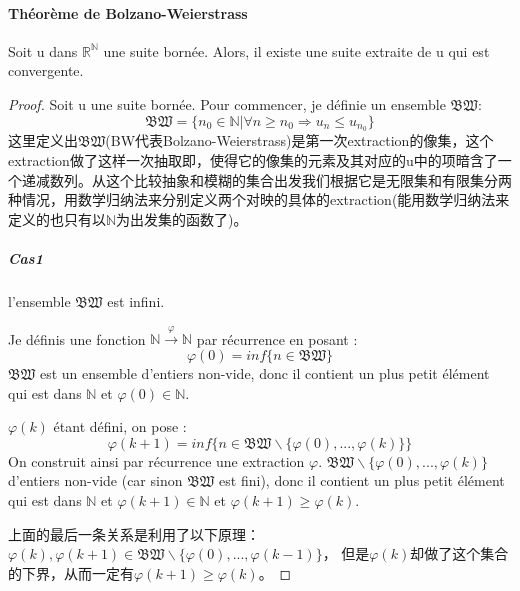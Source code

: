 \documentclass[12pt]{book}
\theoremstyle{definition}\newtheorem{dfn}{Définition}[chapter]
\theoremstyle{plain}\newtheorem{thm}{Théorème}[chapter]
\theoremstyle{plain}\newtheorem{prp}{Proposition}[chapter]
\theoremstyle{plain}\newtheorem{lem}{\bf Lemme}[chapter]
\theoremstyle{plain}\newtheorem{axm}{\bf Axiome}[chapter]
\theoremstyle{plain}\newtheorem{lmm}{\bf Lemme}[chapter]
\theoremstyle{plain}\newtheorem{exm}{\bf Example}[chapter]
\theoremstyle{plain}\newtheorem{cor}{\bf Corollaire}[chapter]
\theoremstyle{remark}\newtheorem{rem}{Remarque}[chapter]
\begin{document}
\paragraph{Théorème de Bolzano-Weierstrass}
Soit u dans $\mathbb{R}^\mathbb{N}$ une suite bornée. Alors, il existe une suite extraite de u qui est convergente.
\begin{proof}
Soit u une suite bornée. Pour commencer, je définie un ensemble $\mathfrak{BW}$:
\begin{equation*}
\mathfrak{BW} = \{n_0 \in \mathbb{N}|\forall n \ge n_0 \Longrightarrow u_{n} \leqslant u_{n_0} \}
\end{equation*}
这里定义出$\mathfrak{BW}$(BW代表Bolzano-Weierstrass)是第一次extraction的像集，这个extraction做了这样一次抽取即，使得它的像集的元素及其对应的u中的项暗含了一个递减数列。从这个比较抽象和模糊的集合出发我们根据它是无限集和有限集分两种情况，用数学归纳法来分别定义两个对映的具体的extraction(能用数学归纳法来定义的也只有以$\mathbb{N}$为出发集的函数了)。
\subparagraph{Cas1}
l’ensemble $\mathfrak{BW}$ est infini.

Je définis une fonction $\mathbb{N}\xrightarrow{\varphi} \mathbb{N}$ par récurrence en posant :
\begin{equation*}
\varphi(0)=inf\{n \in \mathfrak{BW}\}
\end{equation*}
$\mathfrak{BW}$ est un ensemble d’entiers non-vide, donc il contient un plus petit élément qui est dans $\mathbb{N}$ et
$\varphi(0) \in \mathbb{N}$.


$\varphi(k)$ étant défini, on pose :
\begin{equation*}
\varphi(k+1)=inf\{n \in \mathfrak{BW}\backslash \{\varphi(0),...,\varphi(k)\}\}
\end{equation*}
On construit ainsi par récurrence une extraction $\varphi$.
 $\mathfrak{BW}\backslash \{\varphi(0),...,\varphi(k)\}$ d’entiers non-vide (car sinon $\mathfrak{BW}$ est fini), donc il contient un plus petit élément qui est dans $\mathbb{N}$ et $\varphi(k+1) \in \mathbb{N}$ et $\varphi(k+1) \ge \varphi(k)$.

 上面的最后一条关系是利用了以下原理：$\varphi(k) , \varphi(k+1) \in \mathfrak{BW}\backslash \{\varphi(0),...,\varphi(k-1)\}$，
 但是$\varphi(k)$却做了这个集合的下界，从而一定有$\varphi(k+1) \ge \varphi(k)$。


\end{proof}
\end{document}
